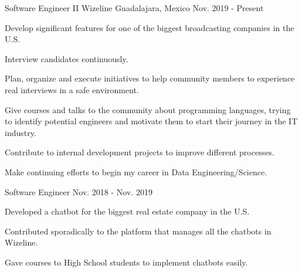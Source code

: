 

\begin{cventries}

  \cventry
    {Software Engineer II} %
    {Wizeline} %
    {Guadalajara, Mexico} %
    {Nov. 2019 - Present} %
    {
      \begin{cvitems} %
        \item {Develop significant features for one of the biggest broadcasting companies in the U.S.}
        \item {Interview candidates continuously.}
        \item {Plan, organize and execute initiatives to help community members to experience real interviews in a safe environment.}
        \item {Give courses and talks to the community about programming languages, trying to identify potential engineers and motivate them to start their journey in the IT industry.}
        \item {Contribute to internal development projects to improve different processes.}
        \item {Make continuing efforts to begin my career in Data Engineering/Science.}
      \end{cvitems}
    }
    
  \cventry
    {Software Engineer} %
    {} %
    {} %
    {Nov. 2018 - Nov. 2019} %
    {
      \begin{cvitems} %
        \item {Developed a chatbot for the biggest real estate company in the U.S.}
        \item {Contributed sporadically to the platform that manages all the chatbots in Wizeline.}
        \item {Gave courses to High School students to implement chatbots easily.}
      \end{cvitems}
    }
    

\end{cventries}
